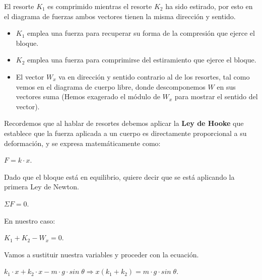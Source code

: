 \documentclass[a4paper,12pt]{article} %
\begin{document}
\begin{justify}
    El resorte \(K_1\) es comprimido mientras el resorte \(K_2\) ha sido  estirado, por esto en el diagrama de fuerzas ambos vectores tienen la misma dirección y sentido. 
\end{justify}

\begin{itemize}
    \item \(K_1\) emplea una fuerza para recuperar su forma de la compresión que ejerce el bloque. 
    \item \(K_2\) emplea una fuerza para comprimirse del estiramiento que ejerce el bloque. 
    \item El vector \(W_x\) va en dirección y sentido contrario al de los resortes, tal como vemos en el diagrama de cuerpo libre, donde descomponemos \(W\) en sus vectores suma (Hemos exagerado el módulo de \(W_x\) para mostrar el sentido del vector).
\end{itemize}

\newpage

\begin{justify}
    Recordemos que al hablar de resortes debemos aplicar la \textbf{Ley de Hooke} que establece que la fuerza aplicada a un cuerpo es directamente proporcional a su deformación, y se expresa matemáticamente como:
\end{justify}

\begin{center}
    \(F = k \cdot x.\)
\end{center}

\begin{justify}
    Dado que el bloque está en equilibrio, quiere decir que se está aplicando la primera Ley de Newton.
\end{justify}

\begin{center}
    \(\Sigma F = 0.\)
\end{center}

\begin{justify}
    En nuestro caso:
\end{justify}

\begin{center}
    \(K_1 + K_2 - W_x = 0.\)
\end{center}
\begin{justify}
    Vamos a sustituir nuestra variables y proceder con la ecuación.
\end{justify}

\(k_1 \cdot x + k_2 \cdot x - m \cdot g \cdot sin\;\theta  \Longrightarrow x \left(k_1 + k_2\right) = m \cdot g \cdot sin \; \theta .\)
\end{document}
